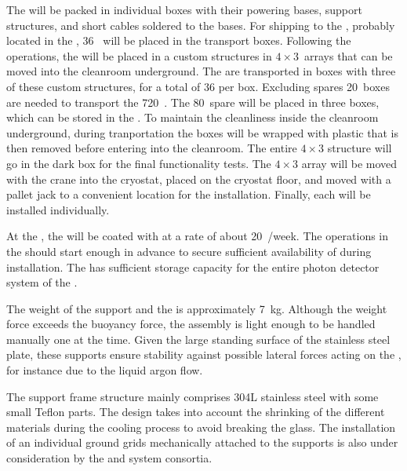 The  will be packed in individual boxes with their powering bases, support structures, and short  cables soldered to the bases.
For shipping to the , probably located in the , 36~ will  be placed in the transport boxes.
Following the  operations, the  will be placed in a custom structures in $4 \times 3$~arrays that can be moved into the cleanroom underground.
The  are transported in boxes with three of these custom structures, for a total of 36 per box.
Excluding spares 20~boxes are needed to transport the 720~.
The 80~spare  will be placed in three boxes, which can be stored in the .
To maintain the cleanliness inside the cleanroom underground, during tranportation the boxes will be wrapped with plastic that is then removed before entering into the cleanroom.
The entire $4 \times 3$ structure will go in the dark box for the final functionality tests.
The $4 \times 3$ array will be moved with the crane into the cryostat, placed on the cryostat floor, and moved with a pallet jack to a convenient location for the installation. Finally, each  will be installed individually.

At the , the  will be coated with  at a rate of about 20~/week.
The operations in the  should start enough in advance to secure sufficient availability of  during installation.
The  has sufficient storage capacity for the entire photon detector system of the .

The weight of the support and the  is approximately 7~kg.
Although the weight force exceeds the buoyancy force, the assembly is light enough to be handled manually one at the time. 
Given the large standing surface of the stainless steel plate, these supports ensure stability against possible lateral forces acting on the , for instance due to the liquid argon flow.

The support frame structure mainly comprises 304L stainless steel with some small Teflon parts.
The design takes into account the shrinking of the different materials during the cooling process to avoid breaking the  glass.
The installation of an individual ground grids mechanically attached to the  supports is also under consideration by the  and  system consortia.

